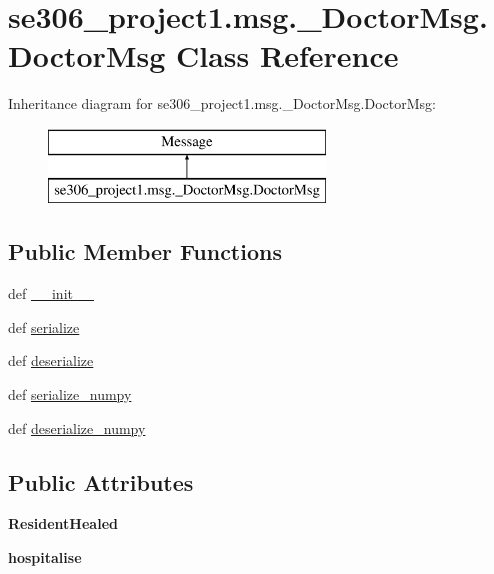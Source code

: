 \hypertarget{classse306__project1_1_1msg_1_1__DoctorMsg_1_1DoctorMsg}{\section{se306\-\_\-project1.\-msg.\-\_\-\-Doctor\-Msg.\-Doctor\-Msg Class Reference}
\label{classse306__project1_1_1msg_1_1__DoctorMsg_1_1DoctorMsg}
}
Inheritance diagram for se306\-\_\-project1.\-msg.\-\_\-\-Doctor\-Msg.\-Doctor\-Msg\-:\begin{figure}[H]
\begin{center}
\leavevmode
\includegraphics[height=2.000000cm]{classse306__project1_1_1msg_1_1__DoctorMsg_1_1DoctorMsg}
\end{center}
\end{figure}
\subsection*{Public Member Functions}
\begin{DoxyCompactItemize}
\item 
def \hyperlink{classse306__project1_1_1msg_1_1__DoctorMsg_1_1DoctorMsg_acdab3728232479c2431f3dad412d3289}{\-\_\-\-\_\-init\-\_\-\-\_\-}
\item 
def \hyperlink{classse306__project1_1_1msg_1_1__DoctorMsg_1_1DoctorMsg_a17a7a9c4016eecae4ec0da40bbd86e31}{serialize}
\item 
def \hyperlink{classse306__project1_1_1msg_1_1__DoctorMsg_1_1DoctorMsg_ae585ea7a7ad1bf035a68ad1d5eebd081}{deserialize}
\item 
def \hyperlink{classse306__project1_1_1msg_1_1__DoctorMsg_1_1DoctorMsg_a754dadda899fe2abb3b84b8f7ee62ef0}{serialize\-\_\-numpy}
\item 
def \hyperlink{classse306__project1_1_1msg_1_1__DoctorMsg_1_1DoctorMsg_afb7de726ee1e81daf506f49c726d4d6c}{deserialize\-\_\-numpy}
\end{DoxyCompactItemize}
\subsection*{Public Attributes}
\begin{DoxyCompactItemize}
\item 
\hypertarget{classse306__project1_1_1msg_1_1__DoctorMsg_1_1DoctorMsg_aa20dd11e923c7737e98f9ca4bb7f9e82}{{\bfseries Resident\-Healed}}\label{classse306__project1_1_1msg_1_1__DoctorMsg_1_1DoctorMsg_aa20dd11e923c7737e98f9ca4bb7f9e82}

\item 
\hypertarget{classse306__project1_1_1msg_1_1__DoctorMsg_1_1DoctorMsg_ac6bb215d503205f44b153bc8ba88a2c0}{{\bfseries hospitalise}}\label{classse306__project1_1_1msg_1_1__DoctorMsg_1_1DoctorMsg_ac6bb215d503205f44b153bc8ba88a2c0}

\end{DoxyCompactItemize}


